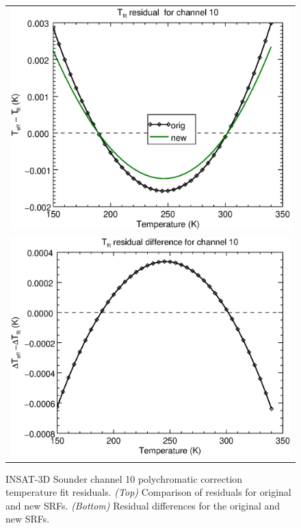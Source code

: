 \begin{figure}[H]
  \centering
  \begin{tabular}{c}
    \includegraphics[scale=0.55]{graphics/sndr/tfit/sndr_insat3d-10.tfit.eps} \\
    \includegraphics[scale=0.55]{graphics/sndr/tfit/sndr_insat3d-10.tfit.difference.eps}
  \end{tabular}
  \caption{INSAT-3D Sounder channel 10 polychromatic correction temperature fit residuals. \emph{(Top)} Comparison of residuals for original and new SRFs. \emph{(Bottom)} Residual differences for the original and new SRFs.}
  \label{fig:sndr_ch10_tfit}
\end{figure}


